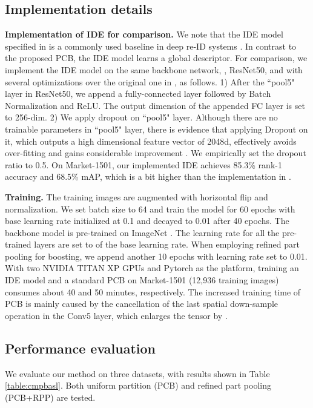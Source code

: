 \documentclass[10pt,twocolumn,letterpaper]{article}
\begin{document}
{{{\subsection{Implementation details} 
\textbf{Implementation of IDE for comparison.} We note that the IDE model specified in \cite{DBLP:journals/corr/ZhengYH16} is a commonly used baseline in deep re-ID systems \cite{DBLP:journals/corr/ZhengYH16,DBLP:journals/corr/ZhengHLY17,DBLP:conf/cvpr/XiaoLOW16,geng2016deep,Sun2017SVDNet,Zheng2017PAN,zheng2017unlabeled,Zhong2017Random}. In contrast to the proposed PCB, the IDE model learns a global descriptor. For comparison, we implement the IDE model on the same backbone network, \ie, ResNet50, and with several optimizations over the original one in \cite{DBLP:journals/corr/ZhengYH16}, as follows.
1) After the ``pool5" layer in ResNet50, we append a fully-connected layer followed by Batch Normalization and ReLU. The output dimension of the appended FC layer is set to 256-dim. 2) We apply dropout on ``pool5" layer. Although there are no trainable parameters in ``pool5" layer, there is evidence that applying Dropout on it, which outputs a high dimensional feature vector of 2048d, effectively avoids over-fitting and gains considerable improvement \cite{Zheng2017PAN,zheng2017unlabeled}. We empirically set the dropout ratio to 0.5.
On Market-1501, our implemented IDE achieves 85.3\% rank-1 accuracy and 68.5\% mAP, which is a bit higher than the implementation in \cite{Zhong2017Random}. 

\textbf{Training.} The training images are augmented with horizontal flip and normalization. We set batch size to 64 and train the model for 60 epochs with base learning rate initialized at 0.1 and decayed to 0.01 after 40 epochs. The backbone model is pre-trained on ImageNet \cite{Deng2009imagenet}. The learning rate for all the pre-trained layers are set to   of the base learning rate. When employing refined part pooling for boosting, we append another 10 epochs with learning rate set to 0.01. With two NVIDIA TITAN XP GPUs and Pytorch as the platform, training an IDE model and a standard PCB on Market-1501 (12,936 training images) consumes about 40 and 50 minutes, respectively. The increased training time of PCB is mainly caused by the cancellation of the last spatial down-sample operation in the Conv5 layer, which enlarges the tensor \bm{} by . 



\subsection{Performance evaluation}\label{sec:baseline}
We evaluate our method on three datasets, with results shown in Table \ref{table:cmpbasl}. Both uniform partition (PCB) and refined part pooling (PCB+RPP) are tested.

}}}
\end{document}
